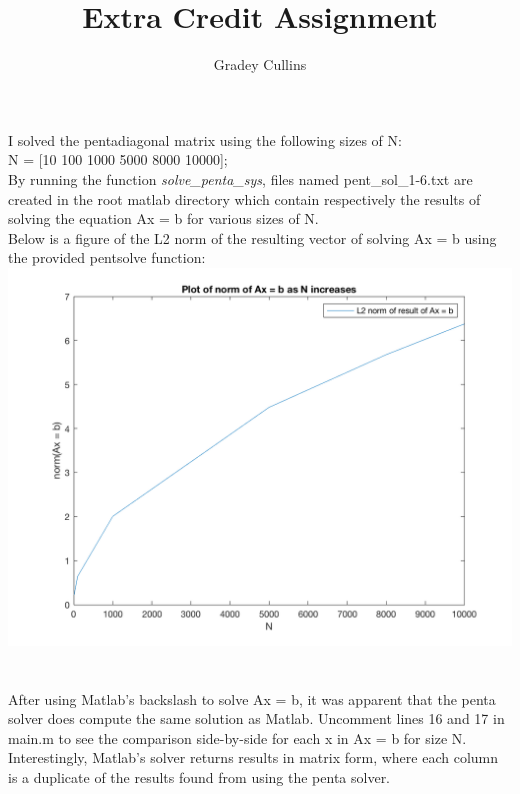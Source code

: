 \documentclass[10pt,a4paper]{article}
\author{Gradey Cullins}
\title{Extra Credit Assignment}
\begin{document}
\maketitle

\section{}
I solved the pentadiagonal matrix using the following sizes of N: \\

\noindent
N = [10 100 1000 5000 8000 10000]; \\

\noindent
By running the function \emph{solve\_penta\_sys}, files named pent\_sol\_1-6.txt are created in the root matlab directory which contain respectively the results of solving the equation Ax = b for various sizes of N. \\

\noindent
Below is a figure of the L2 norm of the resulting vector of solving Ax = b using the provided pentsolve function: \\

\noindent
\includegraphics[scale=0.3]{pent_solve_norm.png} \\

\section{}
After using Matlab's backslash to solve Ax = b, it was apparent that the penta solver does compute the same solution as Matlab. Uncomment lines 16 and 17 in main.m to see the comparison side-by-side for each x in Ax = b for size N. Interestingly, Matlab's solver returns results in matrix form, where each column is a duplicate of the results found from using the penta solver.
\end{document}
